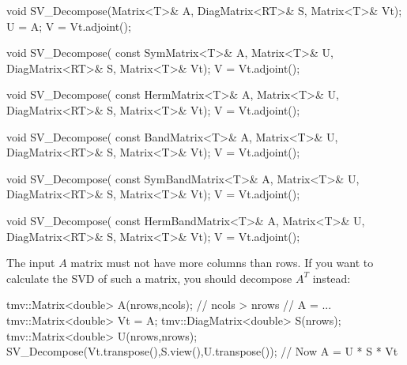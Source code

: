 \begin{tmvcode}
void SV_Decompose(Matrix<T>& A, DiagMatrix<RT>& S, Matrix<T>& Vt);
U = A;
V = Vt.adjoint();

void SV_Decompose(
      const SymMatrix<T>& A, Matrix<T>& U, DiagMatrix<RT>& S, 
      Matrix<T>& Vt);
V = Vt.adjoint();

void SV_Decompose(
      const HermMatrix<T>& A, Matrix<T>& U, DiagMatrix<RT>& S, 
      Matrix<T>& Vt);
V = Vt.adjoint();

void SV_Decompose(
      const BandMatrix<T>& A, Matrix<T>& U, DiagMatrix<RT>& S, 
      Matrix<T>& Vt);
V = Vt.adjoint();

void SV_Decompose(
      const SymBandMatrix<T>& A, Matrix<T>& U, DiagMatrix<RT>& S, 
      Matrix<T>& Vt);
V = Vt.adjoint();

void SV_Decompose(
      const HermBandMatrix<T>& A, Matrix<T>& U, DiagMatrix<RT>& S, 
      Matrix<T>& Vt);
V = Vt.adjoint();
\end{tmvcode}

The input $A$ matrix must not have more columns than rows.  If you want
to calculate the SVD of such a matrix, you should decompose $A^T$ instead:
\begin{tmvcode}
tmv::Matrix<double> A(nrows,ncols); // ncols > nrows
// A = ... 
tmv::Matrix<double> Vt = A;
tmv::DiagMatrix<double> S(nrows);
tmv::Matrix<double> U(nrows,nrows);
SV_Decompose(Vt.transpose(),S.view(),U.transpose());
// Now A = U * S * Vt
\end{tmvcode}

